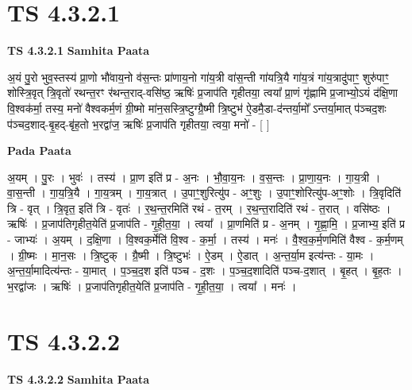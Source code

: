 \documentclass[17pt]{extarticle}
\begin{document}
\section*{ TS 4.3.2.1 }

\textbf{TS 4.3.2.1 } \newline
\textbf{Samhita Paata} \newline

अ॒यं पु॒रो भुव॒स्तस्य॑ प्रा॒णो भौ॑वाय॒नो व॑स॒न्तः प्रा॑णाय॒नो गा॑य॒त्री वा॑स॒न्ती गा॑यत्रि॒यै गा॑य॒त्रं गा॑य॒त्रादु॑पाꣳ॒॒ शुरु॑पाꣳ॒॒ शोस्त्रि॒वृत् त्रि॒वृतो॑ रथन्त॒रꣳ र॑थन्त॒राद्-वसि॑ष्ठ॒ ऋषिः॑ प्र॒जाप॑ति गृहीतया॒ त्वया᳚ प्रा॒णं गृ॑ह्णामि प्र॒जाभ्यो॒ऽयं द॑क्षि॒णा वि॒श्वक॑र्मा॒ तस्य॒ मनो॑ वैश्वकर्म॒णं ग्री॒ष्मो मा॑न॒सस्त्रि॒ष्टुग्ग्रै॒ष्मी त्रि॒ष्टुभ॑ ऐ॒डमै॒डा-द॑न्तर्या॒मो᳚ ऽन्तर्या॒मात् प॑ञ्चद॒शः प॑ञ्चद॒शाद्-बृ॒हद्-बृ॑ह॒तो भ॒रद्वा॑ज॒ ऋषिः॑ प्र॒जाप॑ति गृहीतया॒ त्वया॒ मनो॑ - [  ] \newline

\textbf{Pada Paata} \newline

अ॒यम् । पु॒रः । भुवः॑ । तस्य॑ । प्रा॒ण इति॑ प्र - अ॒नः । भौ॒वा॒य॒नः । व॒स॒न्तः । प्रा॒णा॒य॒नः । गा॒य॒त्री । वा॒स॒न्ती । गा॒य॒त्रि॒यै । गा॒य॒त्रम् । गा॒य॒त्रात् । उ॒पाꣳ॒॒शुरित्यु॑प - अꣳ॒॒शुः । उ॒पाꣳ॒॒शोरित्यु॑प-अꣳ॒॒शोः । त्रि॒वृदिति॑ त्रि - वृत् । त्रि॒वृत॒ इति॑ त्रि - वृतः॑ । र॒थ॒न्त॒रमिति॑ रथं - त॒रम् । र॒थ॒न्त॒रादिति॑ रथं - त॒रात् । वसि॑ष्ठः । ऋषिः॑ । प्र॒जाप॑तिगृहीत॒येति॑ प्र॒जाप॑ति - गृ॒ही॒त॒या॒ । त्वया᳚ । प्रा॒णमिति॑ प्र - अ॒नम् । गृ॒ह्णा॒मि॒ । प्र॒जाभ्य॒ इति॑ प्र - जाभ्यः॑ । अ॒यम् । द॒क्षि॒णा । वि॒श्वक॒र्मेति॑ वि॒श्व - क॒र्मा॒ । तस्य॑ । मनः॑ । वै॒श्व॒क॒र्म॒णमिति॑ वैश्व - क॒र्म॒णम् । ग्री॒ष्मः । मा॒न॒सः । त्रि॒ष्टुक् । ग्रै॒ष्मी । त्रि॒ष्टुभः॑ । ऐ॒डम् । ऐ॒डात् । अ॒न्त॒र्या॒म इत्य॑न्तः - या॒मः । अ॒न्त॒र्या॒मादित्य॑न्तः - या॒मात् । प॒ञ्च॒द॒श इति॑ पञ्च - द॒शः । प॒ञ्च॒द॒शादिति॑ पञ्च-द॒शात् । बृ॒हत् । बृ॒ह॒तः । भ॒रद्वा॑जः । ऋषिः॑ । प्र॒जाप॑तिगृहीत॒येति॑ प्र॒जाप॑ति - गृ॒ही॒त॒या॒ । त्वया᳚ । मनः॑ ।  \newline




\section*{ TS 4.3.2.2 }

\textbf{TS 4.3.2.2 } \newline
\textbf{Samhita Paata} \newline
\end{document}
